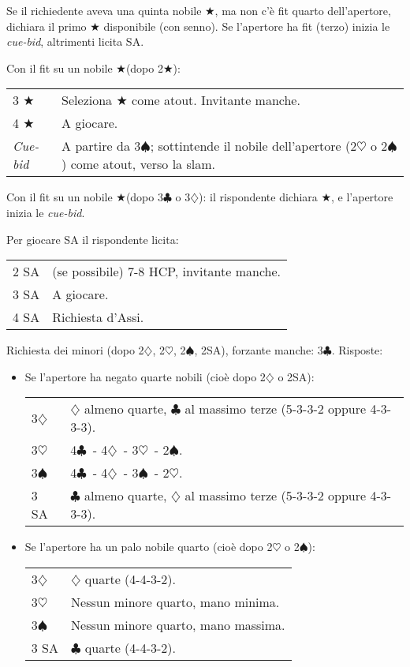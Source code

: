\documentclass[a4paper,10pt]{article}
\renewcommand{\c}{$\clubsuit$\xspace}
\renewcommand{\d}{$\diamondsuit$\xspace}
\newcommand{\h}{$\heartsuit$\xspace}
\newcommand{\s}{$\spadesuit$\xspace}
\renewcommand{\j}{$\bigstar$\xspace}
\newcommand{\sa}{SA\xspace}
\begin{document}
Se il richiedente aveva una quinta nobile \j, ma non c'\`e fit quarto dell'apertore, dichiara il primo \j disponibile (con senno). Se l'apertore ha fit (terzo) inizia le \textit{cue-bid}, altrimenti licita \sa.

Con il fit su un nobile \j (dopo 2\j):

\begin{tabular}{p{} p{}}
 3 \j & Seleziona \j come atout. Invitante manche.\\
 4 \j & A giocare.\\
 \textit{Cue-bid} & A partire da 3\s; sottintende il nobile dell'apertore (2\h o 2\s) come atout, verso la slam.\\
\end{tabular}

Con il fit su un nobile \j (dopo 3\c o 3\d): il rispondente dichiara \j, e l'apertore inizia le \textit{cue-bid}.


Per giocare SA il rispondente licita:

\begin{tabular}{p{} p{}}
 2 \sa & (se possibile) 7-8 HCP, invitante manche.\\
 3 \sa & A giocare.\\
 4 \sa & Richiesta d'Assi.
\end{tabular}

Richiesta dei minori (dopo 2\d, 2\h, 2\s, 2\sa), forzante manche: 3\c. Risposte:
\begin{itemize}
 \item Se l'apertore ha negato quarte nobili (cioè dopo 2\d o 2\sa):
 
  \begin{tabular}{p{} p{}}
    3\d & \d almeno quarte, \c al massimo terze (5-3-3-2 oppure 4-3-3-3).\\
    3\h & 4\c\ - 4\d\ - 3\h\ - 2\s.\\
    3\s & 4\c\ - 4\d\ - 3\s\ - 2\h.\\
    3 \sa & \c almeno quarte, \d al massimo terze (5-3-3-2 oppure 4-3-3-3).
  \end{tabular}

 \item Se l'apertore ha un palo nobile quarto (cioè dopo 2\h o 2\s):
 
  \begin{tabular}{p{} p{}}
    3\d & \d quarte (4-4-3-2).\\
    3\h & Nessun minore quarto, mano minima.\\
    3\s & Nessun minore quarto, mano massima.\\
    3 \sa & \c quarte (4-4-3-2).
  \end{tabular}
\end{itemize}
\end{document}
